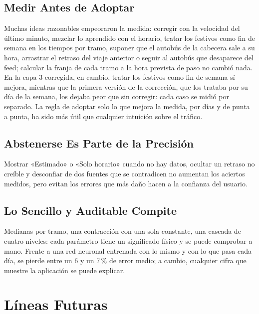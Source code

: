 \subsection{Medir Antes de Adoptar} Muchas ideas razonables empeoraron la medida: corregir con la velocidad del
último minuto,
mezclar lo aprendido con el horario, tratar los festivos como fin
de semana en los tiempos por tramo, suponer que el autobús de la cabecera sale a su hora, arrastrar el retraso del
viaje anterior o seguir al autobús que desaparece del feed; calcular la franja de cada tramo a la hora prevista de paso no
cambió nada. En la capa 3 corregida, en cambio, tratar los
festivos como fin de semana sí mejora, mientras que la primera versión de la corrección, que los trataba por su día de
la semana, los dejaba peor que sin corregir: cada caso se midió por separado. La regla de adoptar solo lo que mejora la medida, por días y de punta a punta, ha sido más útil que
cualquier intuición sobre el tráfico.

\subsection{Abstenerse Es Parte de la Precisión} Mostrar «Estimado» o «Solo horario» cuando no hay datos, ocultar un
retraso no creíble y desconfiar de dos fuentes que se contradicen no aumentan los aciertos medidos, pero evitan los
errores que más daño hacen a la confianza del usuario.

\subsection{Lo Sencillo y Auditable Compite} Medianas por tramo, una contracción con una sola constante, una cascada
de cuatro niveles: cada parámetro tiene un significado físico y se puede comprobar a mano. Frente a una red neuronal
entrenada con lo mismo y con lo que pasa cada día, se pierde entre un 6 y un 7\,\% de error medio; a cambio, cualquier
cifra que muestre la aplicación se puede explicar.

\section{Líneas Futuras}

